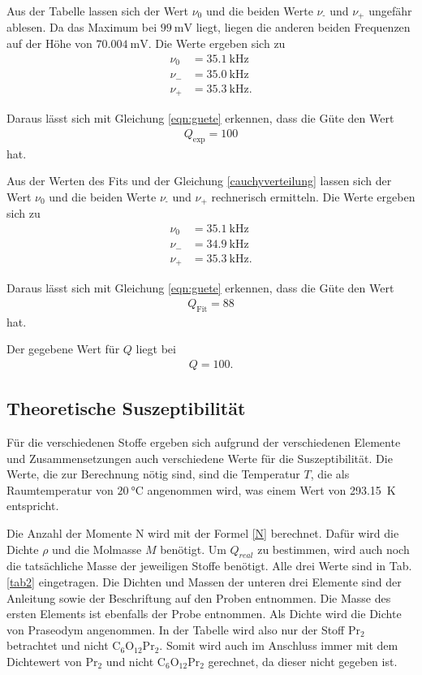 \noindent Aus der Tabelle lassen sich der Wert $\nu_0$ und die beiden Werte $\nu_\text{-}$ und $\nu_\text{+}$ ungefähr ablesen.
Da das Maximum bei $\SI{99}{\milli\volt}$ liegt, liegen die anderen beiden Frequenzen auf der Höhe von $\SI{70.004}{\milli\volt}$.
Die Werte ergeben sich zu 
\begin{align*} 
 \nu_0 &= \SI{35.1}{\kilo\hertz} \\
 \nu_{-} &= \SI{35.0}{\kilo\hertz} \\
 \nu_{+} &= \SI{35.3}{\kilo\hertz}. 
\end{align*}

\noindent Daraus lässt sich mit Gleichung \eqref{eqn:guete} erkennen, dass die Güte den Wert 
\begin{align*} 
    Q_\text{exp} = \num{100}
\end{align*}
hat. 


\noindent Aus der Werten des Fits und der Gleichung \eqref{cauchyverteilung} lassen sich der Wert $\nu_0$ und die beiden Werte $\nu_\text{-}$ und $\nu_\text{+}$ rechnerisch ermitteln.
Die Werte ergeben sich zu 
\begin{align*} 
 \nu_0 &= \SI{35.1}{\kilo\hertz} \\
 \nu_{-} &= \SI{34.9}{\kilo\hertz} \\
 \nu_{+} &= \SI{35.3}{\kilo\hertz}. 
\end{align*}

\noindent Daraus lässt sich mit Gleichung \eqref{eqn:guete} erkennen, dass die Güte den Wert 
\begin{align*} 
    Q_\text{Fit} = \num{88}
\end{align*}
hat. 

\noindent Der gegebene Wert für $Q$ liegt bei 
\begin{align*} 
    Q = \num{100}.
\end{align*}


\subsection{Theoretische Suszeptibilität} 
Für die verschiedenen Stoffe ergeben sich aufgrund der verschiedenen Elemente und Zusammensetzungen auch verschiedene 
Werte für die Suszeptibilität. 
Die Werte, die zur Berechnung nötig sind, sind die Temperatur $T$, die als Raumtemperatur von $\SI{20}{\celsius}$ angenommen wird, was einem Wert von \SI{293.15}{\kelvin} entspricht. 

\noindent Die Anzahl der Momente N wird mit der Formel \eqref{N} berechnet. Dafür wird die Dichte $\rho$ und die Molmasse $M$ benötigt. Um $Q_{real}$ zu bestimmen, wird auch noch die tatsächliche Masse der jeweiligen Stoffe benötigt. Alle drei Werte sind in Tab. \ref{tab2} eingetragen.
Die Dichten und Massen der unteren drei Elemente sind der Anleitung \cite{V606} sowie der Beschriftung auf den Proben entnommen.
Die Masse des ersten Elements ist ebenfalls der Probe entnommen. Als Dichte wird die Dichte von Praseodym \cite{Dichte} angenommen. In der Tabelle wird also nur der Stoff $\text{Pr}_2$ betrachtet und nicht $\text{C}_6 \text{O}_{12} \text{Pr}_2$. Somit wird auch im Anschluss immer mit dem Dichtewert von $\text{Pr}_2$ und nicht $\text{C}_6 \text{O}_{12} \text{Pr}_2$ gerechnet, da dieser nicht gegeben ist.

